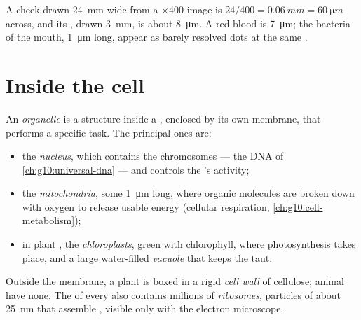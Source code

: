 \begin{example}\label{ex:g10:cells-common-unit:cheek}
A cheek  drawn \qty{24}{mm} wide from a $\times 400$ image is
$24/400 = \qty{0.06}{mm} = \qty{60}{\micro m}$ across, and its ,
drawn \qty{3}{mm}, is about \qty{8}{\micro m}. A red blood  is
\qty{7}{\micro m}; the bacteria of the mouth, \qty{1}{\micro m} long,
appear as barely resolved dots at the same .
\end{example}

\section{Inside the cell}

\begin{definition}[Organelle]\label{def:g10:cells-common-unit:organelle}
An \emph{organelle} is a structure inside a ,
enclosed by its own membrane, that performs a specific task. The
principal ones are:
\begin{itemize}
  \item the \emph{nucleus}, which contains the
        chromosomes --- the DNA of \cref{ch:g10:universal-dna} --- and
        controls the 's activity;
  \item the \emph{mitochondria}, some
        \qty{1}{\micro m} long, where organic molecules are broken down
        with oxygen to release usable energy (cellular respiration,
        \cref{ch:g10:cell-metabolism});
  \item in plant , the \emph{chloroplasts},
        green with chlorophyll, where photosynthesis takes place, and a
        large water-filled \emph{vacuole} that keeps the
         taut.
\end{itemize}
Outside the membrane, a plant  is boxed in a rigid
\emph{cell wall} of cellulose; animal  have none.
The  of every  also contains millions of
\emph{ribosomes}, particles of about \qty{25}{nm} that
assemble , visible only with the electron microscope.
\end{definition}

